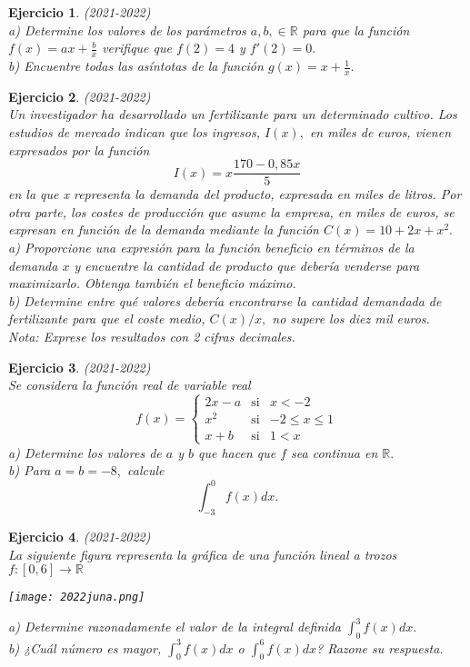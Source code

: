 \documentclass[12pt, a4paper]{amsart}
\newtheorem{ejer}{Ejercicio}
\begin{document}
\begin{ejer}\em (2021-2022)\\
a) Determine los valores de los parámetros $a, b,\in \mathbb{R}$ para que la función $f(x)=ax+\frac{b}{x}$ verifique que $f(2) = 4$ y $f'(2)=0.$\\
b) Encuentre todas las asíntotas de la función $g(x) = x + \frac{1}{x}.$
\end{ejer}

\begin{ejer}\em (2021-2022)\\
Un investigador ha desarrollado un fertilizante para un determinado cultivo. Los estudios de mercado indican que los ingresos, $I(x),$ en miles de euros, vienen expresados por la función
\[I(x) = x\frac{170-0,85x}{5}\]
en la que x representa la demanda del producto, expresada en miles de litros. Por otra parte, los costes de producción que asume la empresa, en miles de euros, se expresan en función de la demanda mediante la función $C(x) = 10 + 2x + x^2.$\\
a) Proporcione una expresión para la función beneficio en términos de la demanda $x$ y encuentre la cantidad de producto que debería venderse para maximizarlo. Obtenga también el beneficio máximo.\\
b) Determine entre qué valores debería encontrarse la cantidad demandada de fertilizante para que el coste medio, $C(x)/x ,$ no supere los diez mil euros.\\
Nota: Exprese los resultados con 2 cifras decimales.
\end{ejer}

\begin{ejer}\em (2021-2022)\\
Se considera la función real de variable real 
\[
f(x)=\left \{ \begin{matrix}
2x-a  & \text{si} & x< -2\\
x^2 & \text{si} & -2\leq x \leq 1\\
x+b & \text{si} & 1< x
\end{matrix}\right.
\]
a) Determine los valores de $a$ y $b$ que hacen que $f$ sea continua en $\mathbb{R}.$\\
b) Para $a = b = -8,$ calcule
\[\int_{-3}^0f(x)dx.\]
\end{ejer}

\begin{ejer}\em (2021-2022)\\
La siguiente figura representa la gráfica de una función lineal a trozos $f:[0,6] \rightarrow \mathbb{R}$
\begin{center}
\texttt{[image: 2022juna.png]}
\end{center}
a) Determine razonadamente el valor de la integral definida $\int_0^3 f(x)dx.$\\
b) ¿Cuál número es mayor,  $\int_0^3 f(x)dx$ o  $\int_0^6 f(x)dx$? Razone su respuesta.
\end{ejer}
\end{document}
